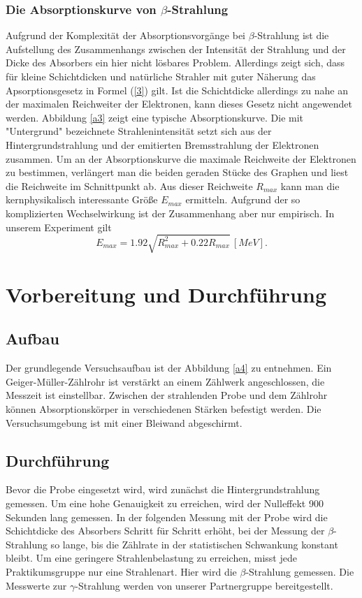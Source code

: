 \documentclass[11pt,ngerman,a4paper]{article}
\begin{document}
\subsubsection{Die Absorptionskurve von $\beta$-Strahlung}
Aufgrund der Komplexität der Absorptionsvorgänge bei $\beta$-Strahlung ist die Aufstellung des Zusammenhangs zwischen der Intensität der Strahlung und der Dicke des Absorbers ein hier nicht lösbares Problem. Allerdings zeigt sich, dass für kleine Schichtdicken und natürliche Strahler mit guter Näherung das Apsorptionsgesetz in Formel (\ref{3}) gilt. Ist die Schichtdicke allerdings zu nahe an der maximalen Reichweiter der Elektronen, kann dieses Gesetz nicht angewendet werden. Abbildung \ref{a3} zeigt eine typische Absorptionskurve. Die mit "Untergrund" bezeichnete Strahlenintensität setzt sich aus der Hintergrundstrahlung und der emitierten Bremsstrahlung der Elektronen zusammen. Um an der Absorptionskurve die maximale Reichweite der Elektronen zu bestimmen, verlängert man die beiden geraden Stücke des Graphen und liest die Reichweite im Schnittpunkt ab. Aus dieser Reichweite $R_{max}$ kann man die kernphysikalisch interessante Größe $E_{max}$ ermitteln. Aufgrund der so komplizierten Wechselwirkung ist der Zusammenhang aber nur empirisch. In unserem Experiment gilt
\begin{equation}
E_{max} = 1.92\sqrt{R_{max}^2 + 0.22 R_{max}}\, [MeV].
\label{10}
\end{equation}
\section{Vorbereitung und Durchführung}
\subsection{Aufbau}
Der grundlegende Versuchsaufbau ist der Abbildung \ref{a4} zu entnehmen. Ein Geiger-Müller-Zählrohr ist verstärkt an einem Zählwerk angeschlossen, die Messzeit ist einstellbar. Zwischen der strahlenden Probe und dem Zählrohr können Absorptionskörper in verschiedenen Stärken befestigt werden. Die Versuchsumgebung ist mit einer Bleiwand abgeschirmt.
\subsection{Durchführung}
Bevor die Probe eingesetzt wird, wird zunächst die Hintergrundstrahlung gemessen. Um eine hohe Genauigkeit zu erreichen, wird der Nulleffekt 900 Sekunden lang gemessen. In der folgenden Messung mit der Probe wird die Schichtdicke des Absorbers Schritt für Schritt erhöht, bei der Messung der $\beta$-Strahlung so lange, bis die Zählrate in der statistischen Schwankung konstant bleibt.\newline
Um eine geringere Strahlenbelastung zu erreichen, misst jede Praktikumsgruppe nur eine Strahlenart. Hier wird die $\beta$-Strahlung gemessen. Die Messwerte zur $\gamma$-Strahlung werden von unserer Partnergruppe bereitgestellt.
\end{document}
